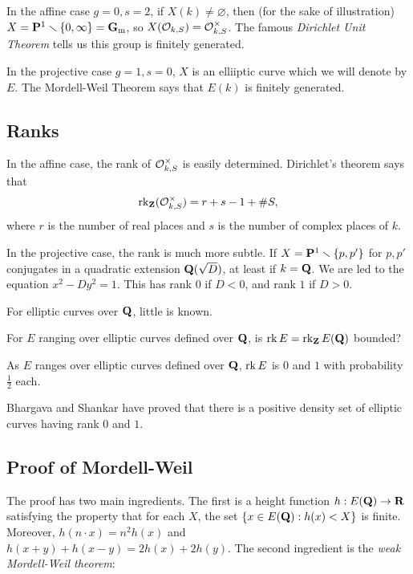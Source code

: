 In the affine case $g=0,s=2$, if $X(k)\ne\varnothing$, then (for the sake of 
illustration) $X = \mathbf{P}^1\smallsetminus \{0,\infty\} = \mathbf{G}_{\mathrm{m}}$, so 
$X(\mathcal{O}_{k,S}) = \mathcal{O}_{k,S}^\times$. The famous \emph{Dirichlet Unit Theorem} 
tells us this group is finitely generated. 

In the projective case $g=1,s=0$, $X$ is an elliiptic curve which we will 
denote by $E$. The Mordell-Weil Theorem says that $E(k)$ is finitely 
generated. 





\subsection{Ranks}

In the affine case, the rank of $\mathcal{O}_{k,S}^\times$ is easily determined. 
Dirichlet's theorem says that 
\[
  \operatorname{rk}_{\mathbf{Z}}(\mathcal{O}_{k,S}^\times) = r+s-1+\# S ,
\]
where $r$ is the number of real places and $s$ is the number of complex 
places of $k$. 

In the projective case, the rank is much more subtle. If 
$X=\mathbf{P}^1\smallsetminus \{p,p'\}$ for $p,p'$ conjugates in a quadratic 
extension $\mathbf{Q}(\sqrt D)$, at least if $k=\mathbf{Q}$. We are led to the equation 
$x^2-D y^2=1$. This has rank $0$ if $D<0$, and rank $1$ if $D>0$. 

For elliptic curves over $\mathbf{Q}$, little is known. 

\begin{conjecture}
For $E$ ranging over elliptic curves defined over $\mathbf{Q}$, 
is $\operatorname{rk} E=\operatorname{rk}_{\mathbf{Z}} E(\mathbf{Q})$ bounded?
\end{conjecture}

\begin{conjecture}
As $E$ ranges over elliptic curves defined over $\mathbf{Q}$, 
$\operatorname{rk} E$ is $0$ and $1$ with probability $\frac 1 2$ each. 
\end{conjecture}

Bhargava and Shankar have proved that there is a positive density set of 
elliptic curves having rank $0$ and $1$. 





\subsection{Proof of Mordell-Weil}

The proof has two main ingredients. The first is a height function 
$h:E(\mathbf{Q}) \to \mathbf{R}$ satisfying the property that for each $X$, the set 
$\{x\in E(\mathbf{Q}):h(x)<X\}$ is finite. Moreover, 
$h(n\cdot x) = n^2 h(x)$ and $h(x+y)+h(x-y)=2 h(x) + 2 h(y)$. The second 
ingredient is the \emph{weak Mordell-Weil theorem}: 

